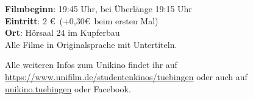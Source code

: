 \textbf{Filmbeginn}: 19:45 Uhr, bei Überlänge 19:15 Uhr\\
\textbf{Eintritt}: 2 \euro ~(+0,30\euro \ beim ersten Mal)\\
\textbf{Ort}: Hörsaal 24 im Kupferbau\\
Alle Filme in Originalsprache mit Untertiteln.

Alle weiteren Infos zum Unikino findet ihr auf
\url{https://www.unifilm.de/studentenkinos/tuebingen} oder auch auf
\href{https://www.instagram.com/Unikino.Tuebingen}{unikino.tuebingen}
oder Facebook.
